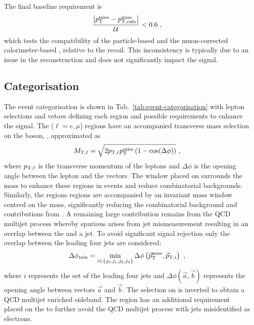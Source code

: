The final baseline requirement is
%
\begin{equation}
    \frac{\big| p_{\text{T}}^{\mathrm{miss}} - p_{\text{T,calo}}^{\mathrm{miss}} \big|}{\mathcal{U}} < 0.6\ ,
\end{equation}
%
which tests the compatibility of the particle-based \ptmiss and the
muon-corrected calorimeter-based \ptmisscalo, relative to the recoil. This
inconsistency is typically due to an issue in the reconstruction and does not
significantly impact the signal.


\subsection{Categorisation}\label{sec:categorisation}

The event categorisation is shown in Tab.~\ref{tab:event-categorisation} with
lepton selections and vetoes defining each region and possible requirements to
enhance the signal. The \ellplusjets ($\ell=e,\mu$) regions have an
accompanied transverse mass selection on the \PW boson, \mtell, approximated as
%
\begin{equation}
    \mtell = \sqrt{2 \mom_{\mathrm{T},\ell} \ptmiss \left( 1 - \cos(\Delta\phi)\right)}\ ,
\end{equation}
%
where $p_{\mathrm{T},\ell}$ is the transverse momentum of the leptons and
$\Delta\phi$ is the opening angle between the lepton and the \vecptmiss
vectors. The window placed on \mtell surrounds the \PW mass to enhance these
regions in \IWj events and reduce combinatorial backgrounds. Similarly, the
\diellplusjets regions regions are accompanied by an invariant mass \mellell
window centred on the \PZ mass, significantly reducing the combinatorial
background and contributions from \Igstarj. A remaining large contribution
remains from the QCD multijet process whereby spurious \ptmiss arises from jet
mismeasurement  resulting in an overlap between the \ptmiss and a jet. To
avoid significant signal rejection only the overlap between the leading four
jets are considered:
%
\begin{equation}
    \Delta\phi_{\mathrm{min}} = \min_{i\in\{j_0,j_1,j_2,j_3\}} \Delta\phi\left(\vec{p}_{\text{T}}^{\mathrm{miss}}, \vec{p}_{\mathrm{T},i}\right)\ ,
\end{equation}
%
where $i$ represents the set of the leading four jets and
$\Delta\phi(\vec{a},\vec{b})$ represents the opening angle between vectors
$\vec{a}$ and $\vec{b}$. The selection on \mindphi is inverted to obtain a QCD
multijet enriched sideband. The \eleplusjets region has an additional
requirement placed on the \ptmiss to further avoid the QCD multijet process
with jets misidentified as electrons.

